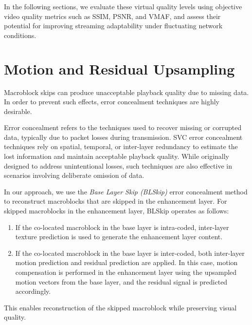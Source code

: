     In the following sections, we evaluate these virtual quality levels using
    objective video quality metrics such as SSIM, PSNR, and VMAF, and assess
    their potential for improving streaming adaptability under fluctuating
    network conditions.


\section{Motion and Residual Upsampling}
\label{sec:blskip}
    Macroblock skips can produce unacceptable playback quality due to missing
    data.  In order to prevent such effects, error concealment techniques are
    highly desirable.

    Error concealment refers to the techniques used to recover missing or
    corrupted data, typically due to packet losses during transmission. SVC error concealment techniques
    rely on spatial, temporal, or inter-layer redundancy to estimate the
    lost information and maintain acceptable playback quality. While originally
    designed to address unintentional losses, such techniques are also effective in
    scenarios involving deliberate omission of data.

    In our approach, we use the \textit{Base Layer Skip (BLSkip)} error
    concealment method to reconstruct macroblocks that are skipped in
    the enhancement layer. For skipped macroblocks in the enhancement layer, BLSkip
    operates as follows:
    
    \begin{enumerate}
        \item 
        If the co-located macroblock in the base layer is
        intra-coded, inter-layer texture prediction is used to generate the enhancement
        layer content. 
        
        \item
        If the co-located macroblock in the base layer is inter-coded, both inter-layer
        motion prediction and residual prediction are applied. In this case, motion
        compensation is performed in the enhancement layer using the upsampled
        motion vectors from the base layer, and the residual signal is predicted
        accordingly. 
    \end{enumerate}
    
    This enables reconstruction of the skipped macroblock while preserving visual quality.


